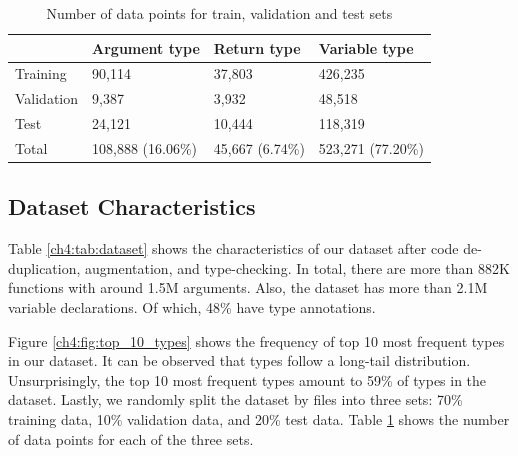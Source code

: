 \begin{table}
	\centering
	\caption{Number of data points for train, validation and test sets}
	\label{ch4:tab:datapoints}
	\begin{tabular}{@{}l l l l@{}}
		\toprule
		& Argument type & Return type & Variable type\\
		\midrule
		Training & 90,114  & 37,803 & 426,235 \\
		Validation & 9,387 & 3,932 & 48,518 \\
		Test & 24,121 & 10,444 & 118,319 \\
		\midrule
		Total &  108,888 (16.06\%) & 45,667 (6.74\%) & 523,271 (77.20\%) \\
		\bottomrule
	\end{tabular}
\end{table}

\subsection{Dataset Characteristics}
Table \ref{ch4:tab:dataset} shows the characteristics of our dataset after code de-duplication, augmentation, and type-checking. In total, there are more than 882K functions with around 1.5M arguments. Also, the dataset has more than 2.1M variable declarations. Of which, 48\% have type annotations.

Figure \ref{ch4:fig:top_10_types} shows the frequency of top 10 most frequent types in our dataset. It can be observed that types follow a long-tail distribution. Unsurprisingly, the top 10 most frequent types amount to 59\% of types in the dataset. Lastly, we randomly split the dataset by files into three sets: 70\% training data, 10\% validation data, and 20\% test data. Table \ref{ch4:tab:datapoints} shows the number of data points for each of the three sets.

